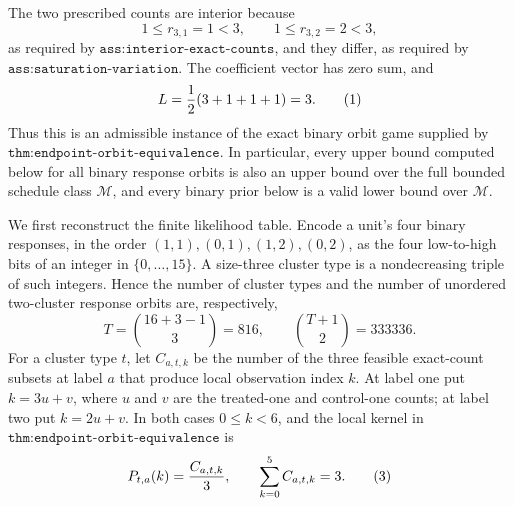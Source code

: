 The two prescribed counts are interior because
\[
1\le r_{3,1}=1<3,
\qquad
1\le r_{3,2}=2<3,
\]
as required by \(\texttt{ass:interior-exact-counts}\), and they differ, as required by \(\texttt{ass:saturation-variation}\).  The coefficient vector has zero sum, and
\[
L={1\over2}(3+1+1+1)=3.                                                    \tag{1}
\]
Thus this is an admissible instance of the exact binary orbit game supplied by \(\texttt{thm:endpoint-orbit-equivalence}\).  In particular, every upper bound computed below for all binary response orbits is also an upper bound over the full bounded schedule class \(\mathcal M\), and every binary prior below is a valid lower bound over \(\mathcal M\).

We first reconstruct the finite likelihood table.  Encode a unit's four binary responses, in the order \((1,1),(0,1),(1,2),(0,2)\), as the four low-to-high bits of an integer in \(\{0,\ldots,15\}\).  A size-three cluster type is a nondecreasing triple of such integers.  Hence the number of cluster types and the number of unordered two-cluster response orbits are, respectively,
\[
T=\binom{16+3-1}{3}=816,
\qquad
\binom{T+1}{2}=333336.                                                       \tag{2}
\]
For a cluster type \(t\), let \(C_{a,t,k}\) be the number of the three feasible exact-count subsets at label \(a\) that produce local observation index \(k\).  At label one put \(k=3u+v\), where \(u\) and \(v\) are the treated-one and control-one counts; at label two put \(k=2u+v\).  In both cases \(0\le k<6\), and the local kernel in \(\texttt{thm:endpoint-orbit-equivalence}\) is
\[
P_{t,a}(k)={C_{a,t,k}\over3},
\qquad
\sum_{k=0}^{5}C_{a,t,k}=3.                                                  \tag{3}
\]

